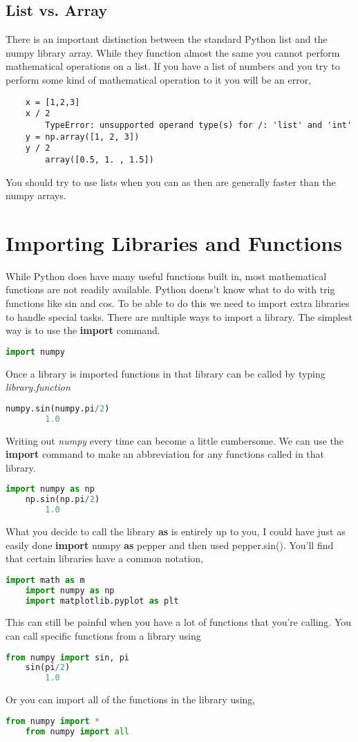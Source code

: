 \documentclass[12pt]{book}
\newcommand\tab[1][0.5cm]{\hspace*{#1}}
\begin{document}
	\subsection{List vs. Array}
	\tab There is an important distinction between the standard Python list and the numpy library array. While they function almost the same you cannot perform mathematical operations on a list. If you have a list of numbers and you try to perform some kind of mathematical operation to it you will be an error,
	\begin{lstlisting}
	x = [1,2,3]
	x / 2
		TypeError: unsupported operand type(s) for /: 'list' and 'int'
	y = np.array([1, 2, 3])
	y / 2
		array([0.5, 1. , 1.5])
	\end{lstlisting}
	You should try to use lists when you can as then are generally faster than the numpy arrays. 
\section{Importing Libraries and Functions}
\tab While Python does have many useful functions built in, most mathematical functions are not readily available. Python doens't know what to do with trig functions like sin and cos. To be able to do this we need to import extra libraries to handle special tasks. There are multiple ways to import a library. The simplest way is to use the \textbf{import} command.
\begin{lstlisting}[language=Python]
	import numpy
\end{lstlisting}
Once a library is imported functions in that library can be called by typing \textit{library.function}
\begin{lstlisting}[language=Python]
	numpy.sin(numpy.pi/2)
		1.0
\end{lstlisting}
Writing out \textit{numpy} every time can become a little cumbersome. We can use the \textbf{import} command to make an abbreviation for any functions called in that library.
\begin{lstlisting}[language=Python]
	import numpy as np
	np.sin(np.pi/2)
		1.0
\end{lstlisting}
What you decide to call the library \textbf{as} is entirely up to you, I could have just as easily done \textbf{import} numpy \textbf{as} pepper and then used pepper.sin(). You'll find that certain libraries have a common notation,
\begin{lstlisting}[language=Python]
	import math as m
	import numpy as np
	import matplotlib.pyplot as plt
\end{lstlisting} This can still be painful when you have a lot of functions that you're calling. You can call specific functions from a library using
\begin{lstlisting}[language=Python]
	from numpy import sin, pi
	sin(pi/2)
		1.0
\end{lstlisting}
Or you can import all of the functions in the library using,
\begin{lstlisting}[language=Python]
	from numpy import *
	from numpy import all
\end{lstlisting}
\end{document}
